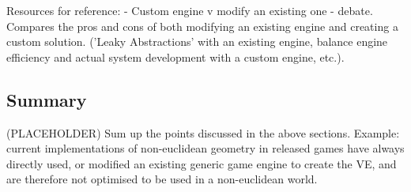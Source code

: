 		Resources for reference:
		\cite{Bruce2012} - Custom engine v modify an existing one - debate. Compares the pros and cons of both modifying an existing engine and creating a custom solution. ('Leaky Abstractions' with an existing engine, balance engine efficiency and actual system development with a custom engine, etc.).
		
	\subsection{Summary}
	\label{lr:cross:conclusion}
		(PLACEHOLDER) Sum up the points discussed in the above sections. Example: current implementations of non-euclidean geometry in released games have always directly used, or modified an existing generic game engine to create the VE, and are therefore not optimised to be used in a non-euclidean world.

